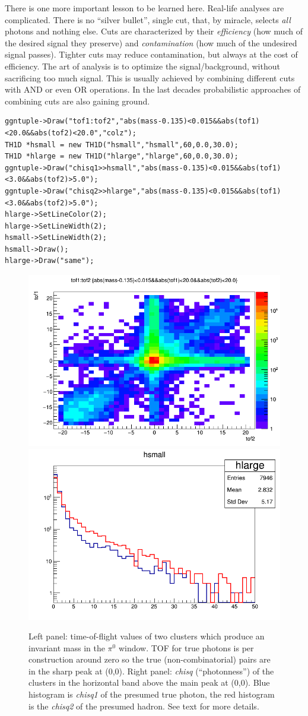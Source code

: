 \documentclass[pdftex,12pt,letter]{article}
\newcommand{\piz}{\mbox{$\pi^0$}\xspace}
\begin{document}
There is one more important lesson to be learned here.  Real-life
analyses are complicated.  There is no ``silver bullet'', single cut,
that, by miracle, selects {\it all} photons and nothing else.
Cuts are characterized by their {\it efficiency} (how much of the
desired signal they preserve) and {\it contamination} (how much of the
undesired signal passes).  Tighter cuts may reduce contamination, but
always at the cost of efficiency.  The art of analysis is to optimize
the signal/background, without sacrificing too much signal.
This is usually achieved by combining different cuts with AND or even
OR operations.  In the last decades probabilistic approaches of
combining cuts are also gaining ground.


\begin{lstlisting}[basicstyle=\scriptsize]
ggntuple->Draw("tof1:tof2","abs(mass-0.135)<0.015&&abs(tof1)<20.0&&abs(tof2)<20.0","colz");
TH1D *hsmall = new TH1D("hsmall","hsmall",60,0.0,30.0);
TH1D *hlarge = new TH1D("hlarge","hlarge",60,0.0,30.0);
ggntuple->Draw("chisq1>>hsmall","abs(mass-0.135)<0.015&&abs(tof1)<3.0&&abs(tof2)>5.0");
ggntuple->Draw("chisq2>>hlarge","abs(mass-0.135)<0.015&&abs(tof1)<3.0&&abs(tof2)>5.0");
hlarge->SetLineColor(2);
hlarge->SetLineWidth(2);
hsmall->SetLineWidth(2);
hsmall->Draw();
hlarge->Draw("same");
\end{lstlisting}


\begin{center}
\begin{figure}[htbp]
  \includegraphics[width=0.45\linewidth]{figs/mbtof1tof2.png}
  \includegraphics[width=0.45\linewidth]{figs/mbchi1chi2.png}
  \caption{Left panel: time-of-flight values of two clusters which
    produce an invariant mass in the \piz window.  TOF for true
    photons is per construction around zero so the true
    (non-combinatorial) pairs are in the sharp peak at (0,0).
    Right panel: {\it chisq} (``photonness'') of the clusters in the
    horizontal band above the main peak at (0,0).  Blue histogram is
    {\it chisq1} of the presumed true photon, the red histogram is the
    {\it chisq2} of the presumed hadron.  See text for more details.
  }
    \label{fig:playtof}
\end{figure}
\end{center}
\end{document}
